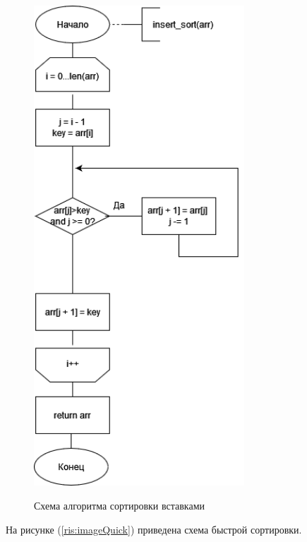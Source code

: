 \documentclass[12pt]{report}
\begin{document}
\begin{figure}
	\begin{center}
	{\includegraphics[height = 18cm]{insert.jpg}}
	\caption{Схема алгоритма сортировки вставками}
	\label{ris:imageInsert}
	\end{center}
\end{figure}
\newpage
На рисунке (\ref{ris:imageQuick}) приведена схема быстрой сортировки.
\end{document}
